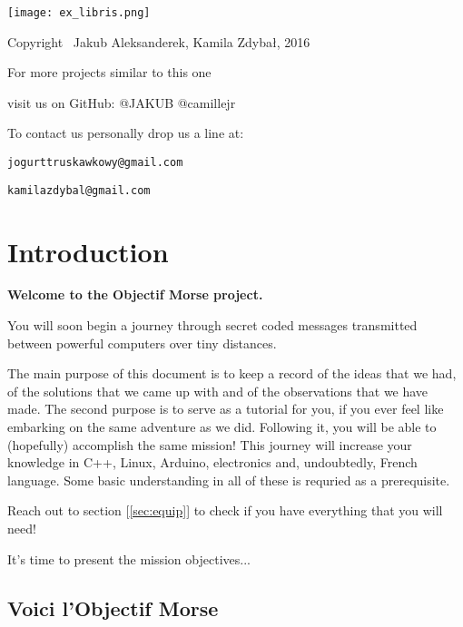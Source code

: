 \documentclass[12pt]{report}
\begin{document}
\thispagestyle{empty}
\begin{center}
    
\vspace*{4cm}

\texttt{[image: ex\_libris.png]}

\vspace*{2cm}

Copyright \textcopyright \, Jakub Aleksanderek, Kamila Zdybał, 2016

For more projects similar to this one

visit us on GitHub: @JAKUB @camillejr

To contact us personally drop us a line at:

\verb|jogurttruskawkowy@gmail.com|

\verb|kamilazdybal@gmail.com|

\end{center}
\newpage




\setlength{\parindent}{0cm}
\clearpage

\tableofcontents

\setlength{\parskip}{1em}
\renewcommand{\baselinestretch}{1.0}

\chapter{Introduction}\label{chap:intro}

\textbf{Welcome to the Objectif Morse project.} 

You will soon begin a journey through secret coded messages transmitted between powerful computers over tiny distances. 

The main purpose of this document is to keep a record of the ideas that we had, of the solutions that we came up with and of the observations that we have made. The second purpose is to serve as a tutorial for you, if you ever feel like embarking on the same adventure as we did. Following it, you will be able to (hopefully) accomplish the same mission! This journey will increase your knowledge in C++, Linux, Arduino, electronics and, undoubtedly, French language. Some basic understanding in all of these is requried as a prerequisite.

Reach out to section [\ref{sec:equip}] to check if you have everything that you will need!

It's time to present the mission objectives...

\section{Voici l'Objectif Morse}
\end{document}
